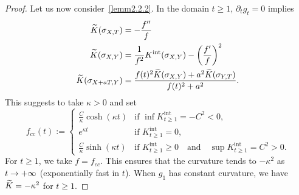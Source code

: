 \documentclass[AHL,Unicode,longabstracts,published]{cedram}
\DeclareMathOperator{\intt}{int}
\theoremstyle{plain}
\let\oldtilde\tilde
\renewcommand*{\tilde}[1]{\mathchoice{\widetilde{#1}}{\widetilde{#1}}{\oldtilde{#1}}{\oldtilde{#1}}}
\renewcommand*{\to}{\mathchoice{\longrightarrow}{\rightarrow}{\rightarrow}{\rightarrow}}
\begin{document}
\begin{proof}
Let us now consider~\eqref{lemm2.2.2}. In the domain $t\geq 1$, $\partial_t g_t = 0$ implies
\begin{align*}
\tilde{K}(\sigma_{X,T}) &= -\frac{f''}{f} \\
\tilde{K}(\sigma_{X,Y}) &= \frac{1}{f^2}K^{\intt}(\sigma_{X,Y}) - \left(\frac{f'}{f}\right)^2\\
\tilde{K}(\sigma_{X+aT,Y})&= \frac{ f(t)^2 \tilde{K}(\sigma_{X,Y}) + a^2 \tilde{K}(\sigma_{Y,T})}{f(t)^2+ a^2}.
\end{align*}
This suggests to take $\kappa>0$ and set
\begin{equation}\label{eq:f-away}
f_{cc}(t):=
\begin{cases}
\frac{C}{\kappa} \cosh(\kappa t) & \text{if }\inf K^{\intt}_{t\geq 1} = - C^2<0,\\
e^{\kappa t} &\text{if }K^{\intt}_{t\geq1} =0,\\
\frac{C}{\kappa} \sinh(\kappa t) & \text{if }K^{\intt}_{t\geq 1}\geq 0\quad\text{and}\quad\sup K^{\intt}_{t\geq 1} = C^2 >0.
\end{cases}
\end{equation}
For $t\geq 1$, we take $f= f_{cc}$. This ensures that the curvature tends to $-\kappa^2$ as $t\to+\infty$ (exponentially fast in $t$). When $g_{1}$ has constant curvature, we have $\tilde{K}=-\kappa^2$ for $t\geq 1$.


\end{proof}
\end{document}
